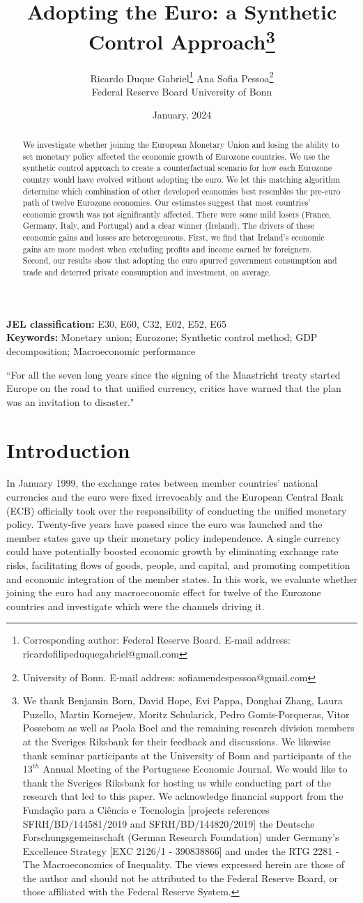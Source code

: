 \documentclass[12pt]{article}
\title{Adopting the Euro: a Synthetic Control Approach\footnote{We thank Benjamin Born, David Hope, Evi Pappa, Donghai Zhang, Laura Puzello, Martin Kornejew, Moritz Schularick, Pedro Gomis-Porqueras, Vitor Possebom as well as Paola Boel and the remaining research division members at the Sveriges Riksbank for their feedback and discussions. We likewise thank seminar participants at the University of Bonn and participants of the $13^{th}$ Annual Meeting of the Portuguese Economic Journal. We would like to thank the Sveriges Riksbank for hosting us while conducting part of the research that led to this paper. We acknowledge financial support from the Fundação para a Ciência e Tecnologia [projects references SFRH/BD/144581/2019 and SFRH/BD/144820/2019] the Deutsche Forschungsgemeinschaft (German Research Foundation) under Germany's Excellence Strategy [EXC 2126/1 - 390838866] and under the RTG 2281 - The Macroeconomics of Inequality. The views expressed herein are those of the author and should not be attributed to the Federal Reserve Board, or those affiliated with the Federal Reserve System.}}
\author{\hspace{-2em} Ricardo Duque Gabriel\footnote{Corresponding author: Federal Reserve Board. E-mail address: ricardofilipeduquegabriel@gmail.com} \hspace{5em} Ana Sofia Pessoa\footnote{University of Bonn. E-mail address: sofiamendespessoa@gmail.com}\\ \hspace{-1em} Federal Reserve Board \hspace{5em} University of Bonn}
\date{January, 2024}
\begin{document}
\begin{titlepage}
\clearpage\thispagestyle{empty}
\maketitle
\thispagestyle{empty}
\vspace{-3em}
\begin{abstract}
We investigate whether joining the European Monetary Union and losing the ability to set monetary policy affected the economic growth of Eurozone countries. We use the synthetic control approach to create a counterfactual scenario for how each Eurozone country would have evolved without adopting the euro. We let this matching algorithm determine which combination of other developed economies best resembles the pre-euro path of twelve Eurozone economies. Our estimates suggest that most countries' economic growth was not significantly affected. There were some mild losers (France, Germany, Italy, and Portugal) and a clear winner (Ireland). The drivers of these economic gains and losses are heterogeneous. First, we find that Ireland's economic gains are more modest when excluding profits and income earned by foreigners. Second, our results show that adopting the euro spurred government consumption and trade and deterred private consumption and investment, on average. 
\end{abstract}

\vspace{1ex}
\textbf{JEL classification:} E30, E60, C32, E02, E52, E65 \\

\textbf{Keywords:}  Monetary union; Eurozone; Synthetic control method; GDP decomposition; Macroeconomic performance

\end{titlepage}

\clearpage

\doublespacing

\indent ``For all the seven long years since the signing of the Maastricht treaty started Europe on the road to that unified currency, critics have warned that the plan was an invitation to disaster." \cite{Krugman1998}

\section{Introduction}

In January 1999, the exchange rates between member countries’ national currencies and the euro were fixed irrevocably and the European Central Bank (ECB) officially took over the responsibility of conducting the unified monetary policy. Twenty-five years have passed since the euro was launched and the member states gave up their monetary policy independence. A single currency could have potentially boosted economic growth by eliminating exchange rate risks, facilitating flows of goods, people, and capital, and promoting competition and economic integration of the member states. In this work, we evaluate whether joining the euro had any macroeconomic effect for twelve of the Eurozone countries and investigate which were the channels driving it.
\end{document}
